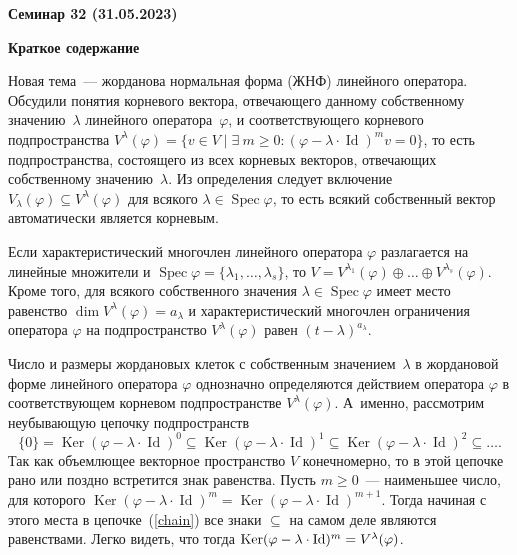 \documentclass[10pt, a4paper]{extarticle}
\newcommand{\Ker}{\mathop{\mathrm{Ker}}}
\newcommand{\Id}{\operatorname{Id}}
\newcommand{\Spec}{\operatorname{Spec}}
\theoremstyle{definition}
\begin{document}
\begin{center}
\small
\noindent{}
\end{center}

\large

\begin{center}
\textbf{Семинар 32 (31.05.2023)}
\end{center}

\textbf{Краткое содержание}

Новая тема~--- жорданова нормальная форма (ЖНФ) линейного оператора.
Обсудили понятия корневого вектора, отвечающего данному собственному значению~$\lambda$ линейного оператора~$\varphi$, и соответствующего корневого подпространства $V^\lambda(\varphi) = \{ v\in V \mid \exists \ m \geqslant 0 : (\varphi - \lambda \cdot \Id)^mv=0 \}$, то есть подпространства, состоящего из всех корневых векторов, отвечающих собственному значению~$\lambda$.
Из определения следует включение $V_\lambda(\varphi) \subseteq V^{\lambda}(\varphi)$ для всякого $\lambda \in \Spec \varphi$, то есть всякий собственный вектор автоматически является корневым.

Если характеристический многочлен линейного оператора $\varphi$ разлагается на линейные множители и $\Spec \varphi = \{ \lambda_1, \ldots, \lambda_s \}$, то $V = V^{\lambda_1}(\varphi) \oplus \ldots \oplus V^{\lambda_s}(\varphi)$.
Кроме того, для всякого собственного значения $\lambda \in \Spec \varphi$ имеет место равенство $\dim V^{\lambda}(\varphi) = a_\lambda$ и характеристический многочлен ограничения оператора $\varphi$ на подпространство $V^{\lambda}(\varphi)$ равен $(t - \lambda)^{a_\lambda}$.

Число и размеры жордановых клеток с собственным значением~$\lambda$ в жордановой форме линейного оператора $\varphi$ однозначно определяются действием оператора $\varphi$ в соответствующем корневом подпространстве $V^{\lambda}(\varphi)$.
А~именно, рассмотрим неубывающую цепочку подпространств
\begin{equation} \label{chain}
\{ 0 \} = \Ker (\varphi - \lambda \cdot \Id)^0 \subseteq \Ker (\varphi - \lambda \cdot \Id)^1 \subseteq \Ker (\varphi - \lambda \cdot \Id)^2 \subseteq \ldots.
\end{equation}
Так как объемлющее векторное пространство $V$ конечномерно, то в этой цепочке рано или поздно встретится знак равенства.
Пусть $m \geqslant 0$~--- наименьшее число, для которого $\Ker (\varphi - \lambda \cdot \Id)^m = \Ker (\varphi - \lambda \cdot \Id)^{m+1}$. Тогда начиная с этого места в цепочке~(\ref{chain}) все знаки \guillemotleft$\subseteq$\guillemotright{} на самом деле являются равенствами.
Легко видеть, что тогда $\Ker (\varphi - \lambda \cdot \Id)^m =\nobreak V^{\lambda}(\varphi)$.
\end{document}
